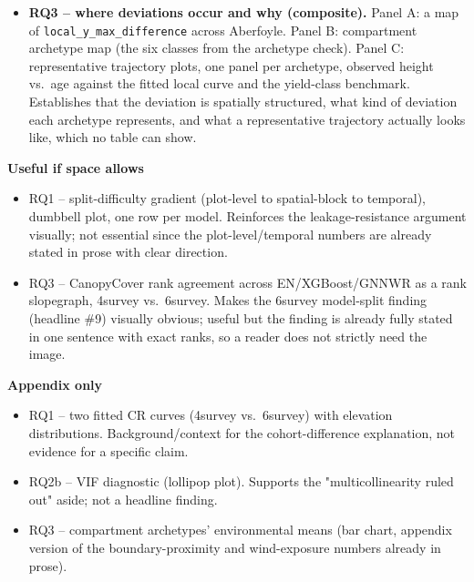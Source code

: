\documentclass[11pt,a4paper]{report}
\begin{document}
\begin{itemize}
  residual Moran's I by set/model/cohort, showing the 4survey reduction and 6survey
  increase side by side. Panel C: GNNWR's own per-plot local coefficient map for the
  variable ranked first. Establishes the accuracy edge, its CI-overlap caveat, its
  independent spatial corroboration, and what a genuinely spatially-varying
  coefficient looks like, in one figure.
\item \textbf{RQ3 -- where deviations occur and why (composite).} Panel A: a map of
  \texttt{local\_y\_max\_difference} across Aberfoyle. Panel B: compartment archetype
  map (the six classes from the archetype check). Panel C: representative trajectory
  plots, one panel per archetype, observed height vs.\ age against the fitted local
  curve and the yield-class benchmark. Establishes that the deviation is spatially
  structured, what kind of deviation each archetype represents, and what a
  representative trajectory actually looks like, which no table can show.
\end{itemize}

\textbf{Useful if space allows}

\begin{itemize}
\item RQ1 -- split-difficulty gradient (plot-level to spatial-block to temporal),
  dumbbell plot, one row per model. Reinforces the leakage-resistance argument
  visually; not essential since the plot-level/temporal numbers are already stated in
  prose with clear direction.
\item RQ3 -- CanopyCover rank agreement across EN/XGBoost/GNNWR as a rank
  slopegraph, 4survey vs.\ 6survey. Makes the 6survey model-split finding (headline
  \#9) visually obvious; useful but the finding is already fully stated in one
  sentence with exact ranks, so a reader does not strictly need the image.
\end{itemize}

\textbf{Appendix only}

\begin{itemize}
\item RQ1 -- two fitted CR curves (4survey vs.\ 6survey) with elevation
  distributions. Background/context for the cohort-difference explanation, not
  evidence for a specific claim.
\item RQ2b -- VIF diagnostic (lollipop plot). Supports the "multicollinearity ruled
  out" aside; not a headline finding.
\item RQ3 -- compartment archetypes' environmental means (bar chart, appendix
  version of the boundary-proximity and wind-exposure numbers already in prose).
\end{itemize}
\end{document}
